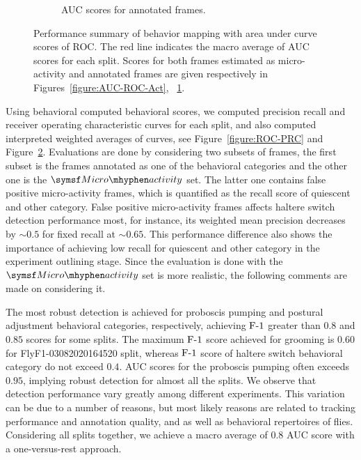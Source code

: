 \begin{figure}[htb!]
\begin{subfigure}[b]{0.5\linewidth}
		\caption{AUC scores for annotated frames. \label{figure:AUC-ROC-Ann}}
	\end{subfigure}%
	\caption[Performance summary of behavior mapping with area under curve scores of ROC.]
	{Performance summary of behavior mapping with area under curve scores of ROC.
		The red line indicates the macro average of AUC scores for each split.
		Scores for both frames estimated as micro-activity and annotated frames are given respectively in Figures~\ref{figure:AUC-ROC-Act}, ~\ref{figure:AUC-ROC-Ann}.
		\label{figure:AUC}}
\end{figure}

Using behavioral computed behavioral scores, we computed precision recall and receiver operating characteristic curves for each split, and also computed interpreted weighted averages of curves, see Figure~\ref{figure:ROC-PRC} and Figure~\ref{figure:AUC}.
Evaluations are done by considering two subsets of frames, the first subset is the frames annotated as one of the behavioral categories and the other one is the $\MicroActivity$ set.
The latter one contains false positive micro-activity frames, which is quantified as the recall score of quiescent and other category.
False positive micro-activity frames affects haltere switch detection performance most, for instance, its weighted mean precision decreases by ${\sim}0.5$ for fixed recall at ${\sim}0.65$.
This performance difference also shows the importance of achieving low recall for quiescent and other category in the experiment outlining stage.
Since the evaluation is done with the $\MicroActivity$ set is more realistic, the following comments are made on considering it.

The most robust detection is achieved for proboscis pumping and postural adjustment behavioral categories, respectively, achieving $\textnormal{F-}1$ greater than $0.8$ and $0.85$ scores for some splits.
The maximum $\textnormal{F-}1$ score achieved for grooming is $0.60$ for FlyF1-03082020164520 split, whereas $\textnormal{F-}1$ score of haltere switch behavioral category do not exceed $0.4$.
AUC scores for the proboscis pumping often exceeds $0.95$, implying robust detection for almost all the splits.
We observe that detection performance vary greatly among different experiments. This variation can be due to a number of reasons, but most likely reasons are related to tracking performance and annotation quality, and as well as behavioral repertoires of flies.
Considering all splits together, we achieve a macro average of $0.8$ AUC score with a one-versus-rest approach.

